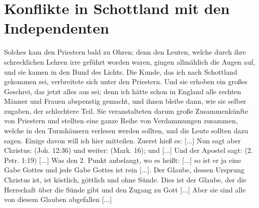 \section{Konflikte in Schottland mit den Independenten}

Solches kam den Priestern bald zu Ohren; denn den Leuten,
welche durch ihre schrecklichen Lehren irre geführt worden waren,
gingen allmählich die Augen auf, und sie kamen in den Bund
des Lichts. Die Kunde, das ich 
nach Schottland gekommen sei,
verbreitete sich unter den Priestern. Und sie erhoben ein großes
Geschrei, das jetzt alles aus sei; denn ich hätte schon in England
alle rechten Männer und Frauen abspenstig gemacht, und ihnen
bleibe dann, wie sie selber zugaben, der schlechtere Teil. Sie 
veranstalteten darum große Zusammenkünfte von Priestern und
stellten eine ganze Reihe von 
Verdammungen zusammen, welche
in den Turmhäusern verlesen werden sollten, und die Leute sollten
 dazu sagen. Einige davon will ich hier mitteilen. Zuerst
hieß es:  [...] Nun sagt aber Christus:  
(Joh. 12:36) und weiter:
(Mark. 16); und  [...] Und der Apostel
sagt:  
(2. Petr. 1:19) [...] Was
den 2. Punkt anbelangt, wo es heißt:  [...] so ist er ja eine Gabe Gottes
und jede Gabe Gottes ist rein [...]. Der Glaube, dessen
Ursprung Christus ist, ist köstlich, göttlich und ohne Sünde. Dies
ist der Glaube, der die Herrschaft über die Sünde gibt und den
Zugang zu Gott [...] Aber sie sind alle von diesem Glauben
abgefallen [...]


